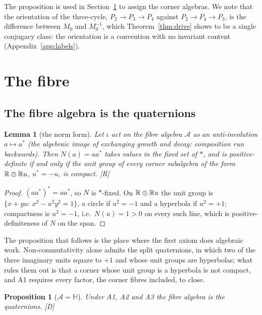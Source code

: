 \documentclass[11pt,a4paper]{article}
\theoremstyle{plain}
\newtheorem{proposition}[theorem]{Proposition}
\newtheorem{lemma}[theorem]{Lemma}
\theoremstyle{definition}
\theoremstyle{remark}
\newcommand{\Hquat}{\mathbb{H}}
\newcommand{\rigR}{[\textup{R}]}
\newcommand{\rigD}{[\textup{D}]}
\begin{document}
The proposition is used in Section~\ref{sec:fibre} to assign the corner algebras. We note that the orientation of the three-cycle, $P_{2}\to P_{3}\to P_{4}$ against $P_{2}\to P_{4}\to P_{3}$, is the difference between $M_{0}$ and $M_{0}^{-1}$, which Theorem~\ref{thm:drive} shows to be a single conjugacy class: the orientation is a convention with no invariant content (Appendix~\ref{app:labels}).

\section{The fibre}\label{sec:fibre}

\subsection{The fibre algebra is the quaternions}

\begin{lemma}[the norm form]\label{lem:norm}
Let $\iota$ act on the fibre algebra $\mathcal{A}$ as an anti-involution $a\mapsto a^{*}$ (the algebraic image of exchanging growth and decay: composition run backwards). Then $N(a)=aa^{*}$ takes values in the fixed set of $*$, and is positive-definite if and only if the unit group of every corner subalgebra of the form $\mathbb{R}\oplus\mathbb{R} u$, $u^{*}=-u$, is compact. \rigR
\end{lemma}

\begin{proof}
$(aa^{*})^{*}=aa^{*}$, so $N$ is $*$-fixed. On $\mathbb{R}\oplus\mathbb{R} u$ the unit group is $\{x+yu:\,x^{2}-u^{2}y^{2}=1\}$, a circle if $u^{2}=-1$ and a hyperbola if $u^{2}=+1$; compactness is $u^{2}=-1$, i.e.\ $N(u)=1>0$ on every such line, which is positive-definiteness of $N$ on the span.
\end{proof}

The proposition that follows is the place where the first axiom does algebraic work. Non-commutativity alone admits the split quaternions, in which two of the three imaginary units square to $+1$ and whose unit groups are hyperbolas; what rules them out is that a corner whose unit group is a hyperbola is not compact, and A1 requires every factor, the corner fibres included, to close.

\begin{proposition}[$\mathcal{A}=\Hquat$]\label{prop:H}
Under A1, A2 and A3 the fibre algebra is the quaternions. \rigD
\end{proposition}
\end{document}
